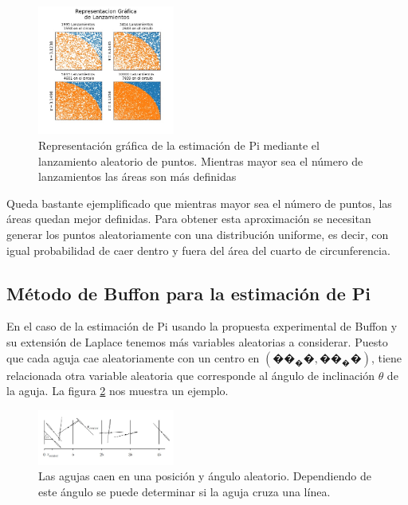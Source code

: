 \documentclass{rbf}
\begin{document}
\begin{figure}[htbp!]
 \centering
  \includegraphics[width=0.4\textwidth]{figures/areas.jpg}
	\caption{Representación gráfica de la estimación de Pi mediante el lanzamiento aleatorio de puntos. Mientras mayor sea el número de lanzamientos las áreas son más definidas}
 \label{area}
\end{figure}

Queda bastante ejemplificado que mientras mayor sea el número de puntos, las áreas quedan mejor definidas.
Para obtener esta aproximación se necesitan generar los puntos aleatoriamente con una distribución uniforme, es decir, con igual probabilidad de caer dentro y fuera del área del cuarto de circunferencia.

\subsection{Método de Buffon para la estimación de Pi}

En el caso de la estimación de Pi usando la propuesta experimental de Buffon y su extensión de Laplace tenemos más variables aleatorias a considerar. Puesto que cada aguja cae aleatoriamente con un centro en $(��_��,��_��)$, tiene relacionada otra variable aleatoria que corresponde al ángulo de inclinación $\theta$ de la aguja. La figura \ref{aguja} nos muestra un ejemplo.



\begin{figure}[tbp!]
 \centering
  \includegraphics[width=0.4\textwidth]{figures/agujas.jpg}
	\caption{Las agujas caen en una posición y ángulo aleatorio. Dependiendo de este ángulo se puede determinar si la aguja cruza una línea.\cite{Statistics}}
 \label{aguja}
\end{figure}
\end{document}
